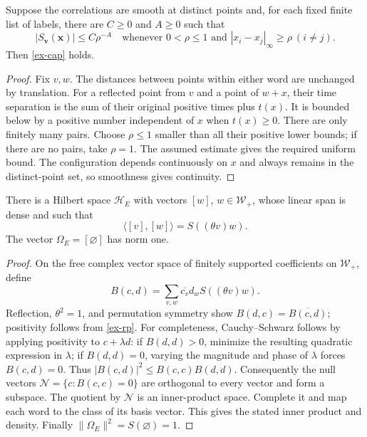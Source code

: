 \begin{lemma}\label{ex-cap-proof}
Suppose the correlations are smooth at distinct points and, for each fixed
finite list of labels, there are \(C\ge0\) and \(A\ge0\) such that
\[
 |S_{\boldsymbol v}(\boldsymbol x)|\le C\rho^{-A}
 \quad\text{whenever }0<\rho\le1\text{ and }
       |x_i-x_j|_\infty\ge\rho\ (i\ne j).
\]
Then \eqref{ex-cap} holds.
\end{lemma}
\begin{proof}
Fix \(v,w\). The distances between points within either word are unchanged
by translation. For a reflected point from \(v\) and a point of \(w+x\),
their time separation is the sum of their original positive times plus
\(t(x)\). It is bounded below by a positive number independent of
\(x\) when \(t(x)\ge0\). There are only finitely many pairs. Choose
\(\rho\le1\) smaller than all their positive lower bounds; if there
are no pairs, take \(\rho=1\). The assumed estimate gives the required
uniform bound. The configuration depends continuously on \(x\) and
always remains in the distinct-point set, so smoothness gives continuity.
\end{proof}

\begin{proposition}\label{ex-gns}
There is a Hilbert space \(\mathcal H_E\) with vectors \([w]\),
\(w\in\mathcal W_+\), whose linear span is dense and such that
\[
 \langle[v],[w]\rangle=S((\theta v)w).
\]
The vector \(\Omega_E=[\varnothing]\) has norm one.
\end{proposition}
\begin{proof}
On the free complex vector space of finitely supported coefficients on
\(\mathcal W_+\), define
\[
 B(c,d)=\sum_{v,w}\overline{c_v}d_w S((\theta v)w).
\]
Reflection, \(\theta^2=1\), and permutation symmetry show
\(B(d,c)=\overline{B(c,d)}\); positivity follows from \eqref{ex-rp}.
For completeness, Cauchy--Schwarz follows by applying positivity to
\(c+\lambda d\): if \(B(d,d)>0\), minimize the resulting quadratic
expression in \(\lambda\); if \(B(d,d)=0\), varying the magnitude and
phase of \(\lambda\) forces \(B(c,d)=0\). Thus
\(|B(c,d)|^2\le B(c,c)B(d,d)\).
Consequently the null vectors \(\mathcal N=\{c:B(c,c)=0\}\) are
orthogonal to every vector and form a subspace. The quotient by
\(\mathcal N\) is an inner-product space. Complete it and map each
word to the class of its basis vector. This gives the stated inner product
and density. Finally
\(\|\Omega_E\|^2=S(\varnothing)=1\).
\end{proof}

